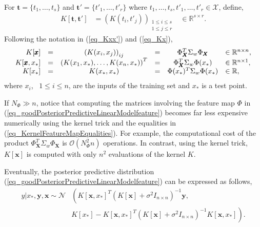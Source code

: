 For $\pmb{t} = \{t_1, \dots, t_s\}$ and $\pmb{t'} = \{t'_1, \dots, t'_r\}$ where $t_1, \dots, t_s, t'_1, \dots, t'_r \in \mathcal{X}$, define,
\begin{equation} \label{eq_Kxx'}
  \begin{aligned}
    K[\pmb{t},\pmb{t'}] &= \left( K(t_i,t'_j) \right)_{\substack{1 \leq i \leq s \\ 1 \leq j \leq r}} &\in \mathbb{R}^{s \times r}.
  \end{aligned}
\end{equation}
Following the notation in (\ref{eq_Kxx'}) and (\ref{eq_Kx}),
\begin{equation} \label{eq_KernelFeatureMapEqualities}
  \begin{array}{r c c c c l}
    K[\pmb{x}] &= &\left( K(x_i,x_j) \right)_{ij} &= &\Phi_{\pmb{X}}^T \Sigma_w \Phi_{\pmb{X}} &\in \mathbb{R}^{n \times n}, \\
    K[\pmb{x},x_*] &= &\left( K(x_1,x_*), \dots, K(x_n,x_*) \right)^T &= & \Phi_{\pmb{X}}^T \Sigma_w \Phi(x_*) &\in \mathbb{R}^{n \times 1}, \\
    K[x_*] &= &K(x_*,x_*) &= &\Phi(x_*)^T \Sigma_w \Phi(x_*) &\in \mathbb{R}, \\
  \end{array} 
\end{equation}
where $x_i$, \ $1 \leq i \leq n$, are the inputs of the training set and $x_*$ is a test point.

\begin{remark}
  If $N_{\Phi} \gg n$, notice that computing the matrices involving the feature map $\Phi$ in (\ref{eq_goodPosteriorPredictiveLinearModelfeature}) becomes far less expensive numerically using the kernel trick and the equalities in (\ref{eq_KernelFeatureMapEqualities}). For example, the computational cost of the product $\Phi_{\pmb{X}}^T \Sigma_w \Phi_{\pmb{X}}$ is $\mathcal{O}(N_{\Phi}^2 n)$ operations. In contrast, using the kernel trick, $K[\pmb{x}]$ is computed with only $n^2$ evaluations of the kernel $K$.
\end{remark}

Eventually, the posterior predictive distribution (\ref{eq_goodPosteriorPredictiveLinearModelfeature}) can be expressed as follows,
\begin{equation} \label{eq_goodPosteriorPredictiveWithKernel}
  \begin{aligned}
    y | x_*, \pmb{y}, \pmb{x}
      \sim \mathcal{N} 
           & \left( K[\pmb{x},x_*]^T 
             \left( K[\pmb{x}] + \sigma^2 I_{n \times n} \right)^{-1} \pmb{y} , \right. \\
           & \left.  K[x_*] - K[\pmb{x},x_*]^T 
             \left(  K[\pmb{x}] + \sigma^2 I_{n \times n} \right)^{-1}
             K[\pmb{x},x_*] 
                       \right). \\
  \end{aligned}
\end{equation} 

